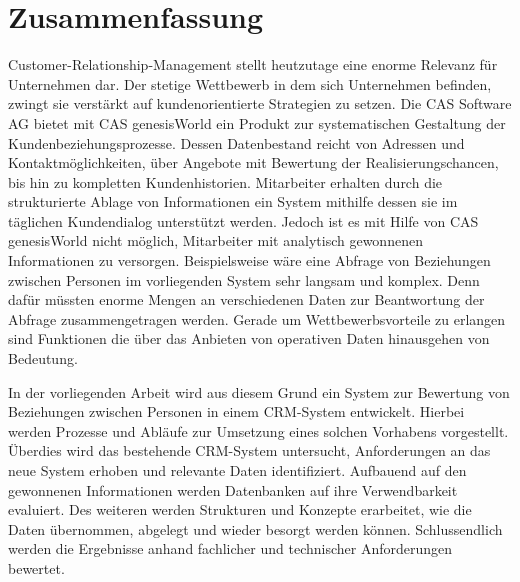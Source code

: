 
\chapter*{\centering Zusammenfassung}


Customer-Relationship-Management stellt heutzutage eine enorme Relevanz für Unternehmen dar. Der stetige Wettbewerb in dem sich Unternehmen
befinden, zwingt sie verstärkt auf kundenorientierte Strategien zu setzen. Die CAS Software AG bietet mit CAS genesisWorld ein Produkt zur systematischen Gestaltung der Kundenbeziehungsprozesse. Dessen Datenbestand reicht von Adressen und Kontaktmöglichkeiten, über Angebote mit Bewertung der Realisierungschancen, bis hin zu kompletten Kundenhistorien. Mitarbeiter erhalten durch die strukturierte Ablage von Informationen ein System mithilfe dessen sie im täglichen Kundendialog unterstützt werden. Jedoch ist es mit Hilfe von CAS genesisWorld nicht möglich, Mitarbeiter mit analytisch gewonnenen Informationen zu versorgen. Beispielsweise wäre eine Abfrage von Beziehungen zwischen Personen im vorliegenden System sehr langsam und komplex. Denn dafür müssten enorme Mengen an verschiedenen Daten zur Beantwortung der Abfrage zusammengetragen werden. Gerade um Wettbewerbsvorteile zu erlangen sind Funktionen die über das Anbieten von operativen Daten hinausgehen von Bedeutung.      

In der vorliegenden Arbeit wird aus diesem Grund ein System zur Bewertung von Beziehungen zwischen Personen in einem CRM-System entwickelt. Hierbei werden Prozesse und Abläufe zur Umsetzung eines solchen Vorhabens vorgestellt. Überdies wird das bestehende CRM-System untersucht, Anforderungen an das neue System erhoben und relevante Daten identifiziert. Aufbauend auf den gewonnenen Informationen werden Datenbanken auf ihre Verwendbarkeit evaluiert. Des weiteren werden Strukturen und Konzepte erarbeitet, wie die Daten übernommen, abgelegt und wieder besorgt werden können. Schlussendlich werden die Ergebnisse anhand fachlicher und technischer Anforderungen bewertet.